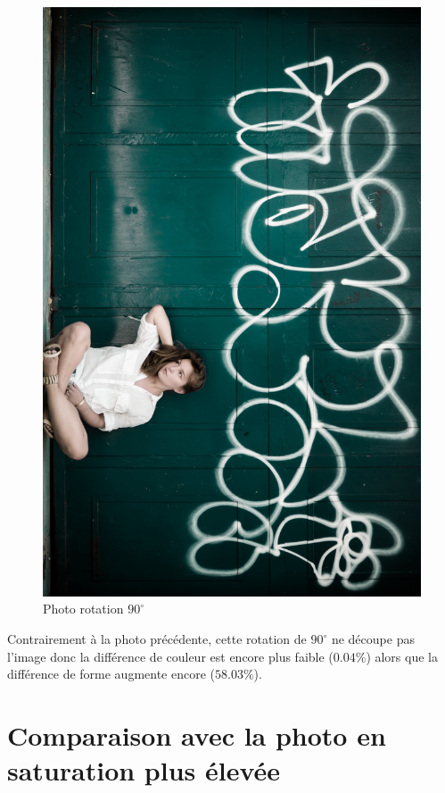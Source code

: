 \documentclass[]{article}
\begin{document}
\begin{figure}[htbp]
\centering
\includegraphics[scale=0.47]{photos/rotation.jpg}
\caption{Photo rotation $90^{\circ}$}
\end{figure}

Contrairement à la photo précédente, cette rotation de $90^{\circ}$ ne
découpe pas l'image donc la différence de couleur est encore plus faible
($0.04\%$) alors que la différence de forme augmente encore ($58.03\%$).

\newpage

\section{Comparaison avec la photo en saturation plus
élevée}\label{comparaison-avec-la-photo-en-saturation-plus-uxe9levuxe9e}
\end{document}
